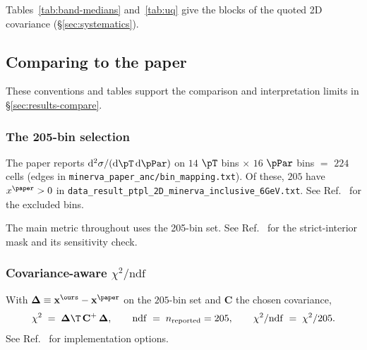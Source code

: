 Tables~\ref{tab:band-medians} and~\ref{tab:uq} give the blocks of the quoted 2D covariance (\S\ref{sec:systematics}).

\subsection{Comparing to the paper}
\label{sec:compare}

These conventions and tables support the comparison and interpretation limits in \S\ref{sec:results-compare}.

\subsubsection{The 205-bin selection}
\label{sec:205bins}

The paper reports $\mathrm{d}^{2}\sigma/(\mathrm{d}\pT\,\mathrm{d}\pPar)$ on $14$ $\pT$ bins $\times$ $16$ $\pPar$ bins $=$ $224$ cells (edges in \texttt{minerva\_paper\_anc/bin\_mapping.txt}). Of these, $205$ have $x^{\paper}>0$ in \texttt{data\_result\_ptpl\_2D\_minerva\_inclusive\_6GeV.txt}. See Ref.~\cite{NoteRecords2026} for the excluded bins.

The main metric throughout uses the 205-bin set. See Ref.~\cite{NoteRecords2026} for the strict-interior mask and its sensitivity check.

\subsubsection{Covariance-aware $\chi^{2}/\mathrm{ndf}$}
\label{sec:chisq}

With $\boldsymbol{\Delta}\equiv\mathbf{x}^{\ours}-\mathbf{x}^{\paper}$ on the $205$-bin set and $\mathbf{C}$ the chosen covariance,
\begin{equation}
\label{eq:chi2}
\chi^{2}
\;=\;
\boldsymbol{\Delta}\T\,\mathbf{C}^{+}\,\boldsymbol{\Delta},
\qquad
\mathrm{ndf} \;=\; n_{\text{reported}} = 205,
\qquad
\chi^{2}/\mathrm{ndf} \;=\; \chi^{2}/205.
\end{equation}
See Ref.~\cite{NoteRecords2026} for implementation options.

